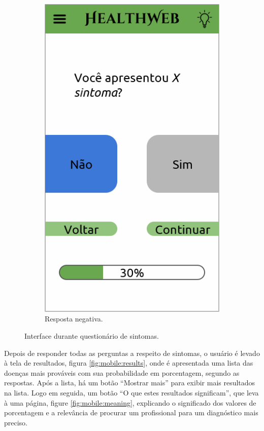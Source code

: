 \begin{figure}[htbp]
\begin{subfigure}{0.24\linewidth}
		\includegraphics[width=\linewidth]{figure/prototype/mobile/symptom_no.png}
		\caption{Resposta negativa.}
		\label{fig:mobile:symptom_no}
	\end{subfigure}
	\hspace{0.11\linewidth}
	\hfill
	\caption{Interface durante questionário de sintomas.}
	\label{fig:mobile:symptom_yes_no}
\end{figure}

Depois de responder todas as perguntas a respeito de sintomas, o usuário é levado à tela de resultados, figura \ref{fig:mobile:results}, onde é apresentada uma lista das doenças mais prováveis com sua probabilidade em porcentagem, segundo as respostas. Após a lista, há um botão ``Mostrar mais'' para exibir mais resultados na lista. Logo em seguida, um botão ``O que estes resultados significam'', que leva à uma página, figure \ref{fig:mobile:meaning}, explicando o significado dos valores de porcentagem e a relevância de procurar um profissional para um diagnóstico mais preciso.

